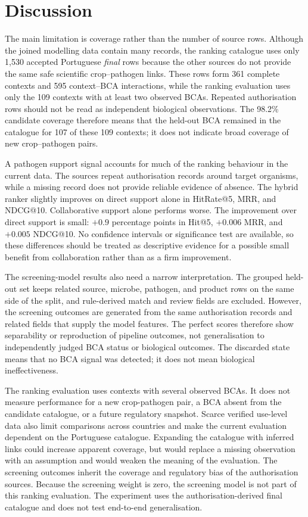 \section{Discussion}\label{sec:discussion}

The main limitation is coverage rather than the number of source rows. Although the joined modelling data contain many
records, the ranking catalogue uses only 1,530 accepted Portuguese \textit{final} rows because the other sources do not
provide the same safe scientific crop--pathogen links. These rows form 361 complete contexts and 595 context--BCA
interactions, while the ranking evaluation uses only the 109 contexts with at least two observed BCAs. Repeated
authorisation rows should not be read as independent biological observations. The 98.2\% candidate coverage therefore
means that the held-out BCA remained in the catalogue for 107 of these 109 contexts; it does not indicate broad coverage
of new crop--pathogen pairs.

A pathogen support signal accounts for much of the ranking behaviour in the current data. The sources repeat
authorisation records around target organisms, while a missing record does not provide reliable evidence of absence.
The hybrid ranker slightly improves on direct support alone in HitRate@5, MRR, and NDCG@10. Collaborative support
alone performs worse. The improvement over direct support is small: $+0.9$ percentage points in Hit@5, $+0.006$
MRR, and $+0.005$ NDCG@10. No confidence intervals or significance test are available, so these differences should be treated as
descriptive evidence for a possible small benefit from collaboration rather than as a firm improvement.

The screening-model results also need a narrow interpretation. The grouped held-out set keeps related source, microbe, pathogen,
and product rows on the same side of the split, and rule-derived match and review fields are excluded. However, the
screening outcomes are generated from the same authorisation records and related fields that supply the model features. The
perfect scores therefore show separability or reproduction of pipeline outcomes, not generalisation to independently
judged BCA status or biological outcomes. The discarded state means that no BCA signal was detected; it does not
mean biological ineffectiveness.

The ranking evaluation uses contexts with several observed BCAs. It does not measure performance for a new crop-pathogen
pair, a BCA absent from the candidate catalogue, or a future regulatory snapshot. Scarce verified use-level data also
limit comparisons across countries and make the current evaluation dependent on the Portuguese catalogue. Expanding the
catalogue with inferred links could increase apparent coverage, but would replace a missing observation with an assumption
and would weaken the meaning of the evaluation.
The screening outcomes inherit the coverage and regulatory bias of the authorisation sources. Because the screening weight is zero,
the screening model is not part of this ranking evaluation. The experiment uses the authorisation-derived final catalogue
and does not test end-to-end generalisation.
